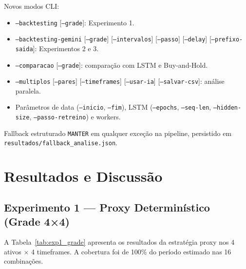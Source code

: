 \documentclass[conference]{IEEEtran}
\begin{document}
Novos modos CLI:
\begin{itemize}
  \item \texttt{--backtesting} [\texttt{--grade}]: Experimento 1.
  \item \texttt{--backtesting-gemini} [\texttt{--grade}] [\texttt{--intervalos}] [\texttt{--passo}] [\texttt{--delay}] [\texttt{--prefixo-saida}]: Experimentos 2 e 3.
  \item \texttt{--comparacao} [\texttt{--grade}]: comparação com LSTM e Buy-and-Hold.
  \item \texttt{--multiplos} [\texttt{--pares}] [\texttt{--timeframes}] [\texttt{--usar-ia}] [\texttt{--salvar-csv}]: análise paralela.
  \item Parâmetros de data (\texttt{--inicio}, \texttt{--fim}), LSTM (\texttt{--epochs}, \texttt{--seq-len}, \texttt{--hidden-size}, \texttt{--passo-retreino}) e workers.
\end{itemize}

Fallback estruturado \texttt{MANTER} em qualquer exceção na pipeline, persistido em \texttt{resultados/fallback\_analise.json}.

\section{Resultados e Discussão}
\label{sec:resultados}

\subsection{Experimento 1 — Proxy Determinístico (Grade 4×4)}

A Tabela~\ref{tab:exp1_grade} apresenta os resultados da estratégia proxy nos 4 ativos × 4 timeframes. A cobertura foi de 100\% do período estimado nas 16 combinações.
\end{document}
